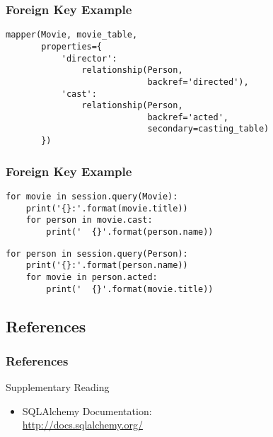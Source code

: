 \documentclass[dvipsnames]{beamer}
\theoremstyle{plain}
\begin{document}
\begin{frame}[fragile]
  \frametitle{Foreign Key Example}

  \begin{lstlisting}
mapper(Movie, movie_table,
       properties={
           'director':
               relationship(Person,
                            backref='directed'),
           'cast':
               relationship(Person,
                            backref='acted',
                            secondary=casting_table)
       })
  \end{lstlisting}
\end{frame}

\begin{frame}[fragile]
  \frametitle{Foreign Key Example}

  \begin{lstlisting}
for movie in session.query(Movie):
    print('{}:'.format(movie.title))
    for person in movie.cast:
        print('  {}'.format(person.name))
  \end{lstlisting}

  \pause
  \begin{lstlisting}
for person in session.query(Person):
    print('{}:'.format(person.name))
    for movie in person.acted:
        print('  {}'.format(movie.title))
  \end{lstlisting}
\end{frame}

\subsection*{References}

\begin{frame}
  \frametitle{References}

  \begin{block}{Supplementary Reading}
    \begin{itemize}
    \item SQLAlchemy Documentation:\\
      \url{http://docs.sqlalchemy.org/}
    \end{itemize}
  \end{block}
\end{frame}
\end{document}
